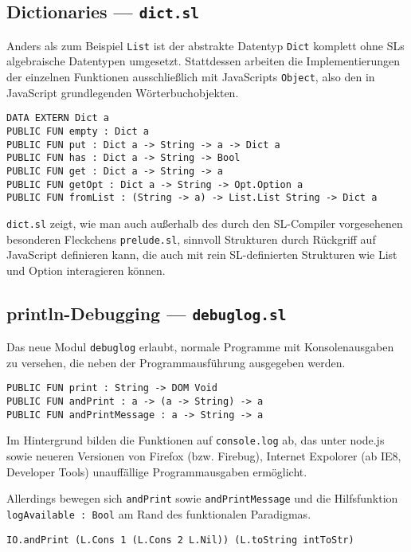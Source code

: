 \documentclass{llncs}
\begin{document}
\subsection{Dictionaries --- \texttt{dict.sl}}

Anders als zum Beispiel \verb|List| ist der abstrakte Datentyp \verb|Dict|
komplett ohne SLs algebraische Datentypen umgesetzt. Stattdessen arbeiten
die Implementierungen der einzelnen Funktionen ausschließlich mit JavaScripts
\verb|Object|, also den in JavaScript grundlegenden Wörterbuchobjekten.

\begin{verbatim}
DATA EXTERN Dict a
PUBLIC FUN empty : Dict a
PUBLIC FUN put : Dict a -> String -> a -> Dict a
PUBLIC FUN has : Dict a -> String -> Bool
PUBLIC FUN get : Dict a -> String -> a
PUBLIC FUN getOpt : Dict a -> String -> Opt.Option a
PUBLIC FUN fromList : (String -> a) -> List.List String -> Dict a
\end{verbatim}

\verb|dict.sl| zeigt, wie man auch außerhalb des durch den SL-Compiler
vorgesehenen besonderen Fleckchens \verb|prelude.sl|, sinnvoll Strukturen
durch Rückgriff auf JavaScript definieren kann, die auch mit rein
SL-definierten Strukturen wie List und Option interagieren können.

\subsection{println-Debugging --- \texttt{debuglog.sl}}

Das neue Modul \verb|debuglog| erlaubt, normale Programme mit Konsolenausgaben
zu versehen, die neben der Programmausführung ausgegeben werden.

\begin{verbatim}
PUBLIC FUN print : String -> DOM Void
PUBLIC FUN andPrint : a -> (a -> String) -> a
PUBLIC FUN andPrintMessage : a -> String -> a
\end{verbatim}

Im Hintergrund bilden die Funktionen auf \verb|console.log| ab, das unter
node.js sowie neueren Versionen von Firefox (bzw. Firebug), Internet Expolorer
(ab IE8, Developer Tools) unauffällige Programmausgaben ermöglicht.

Allerdings bewegen sich \verb|andPrint| sowie \verb|andPrintMessage| und die
Hilfsfunktion \verb|logAvailable : Bool| am Rand des funktionalen Paradigmas.

\begin{verbatim}
IO.andPrint (L.Cons 1 (L.Cons 2 L.Nil)) (L.toString intToStr)
\end{verbatim}
\end{document}
